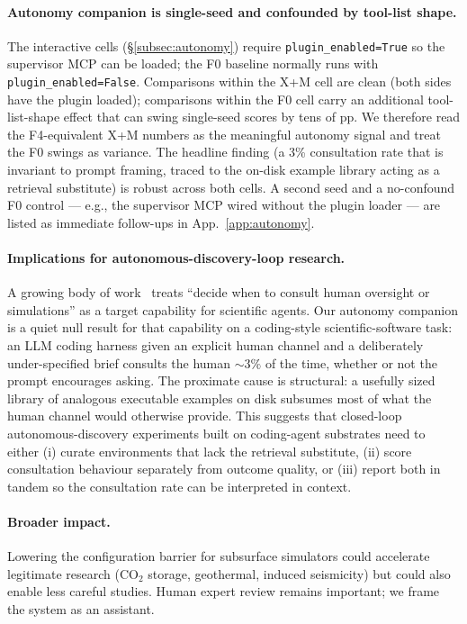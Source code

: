 \documentclass{article}
\begin{document}
\paragraph{Autonomy companion is single-seed and confounded by tool-list shape.}
The interactive cells (\S\ref{subsec:autonomy}) require \texttt{plugin\_enabled=True} so the supervisor MCP can be loaded; the F0 baseline normally runs with \texttt{plugin\_enabled=False}. Comparisons within the X+M cell are clean (both sides have the plugin loaded); comparisons within the F0 cell carry an additional tool-list-shape effect that can swing single-seed scores by tens of pp. We therefore read the F4-equivalent X+M numbers as the meaningful autonomy signal and treat the F0 swings as variance. The headline finding (a 3\% consultation rate that is invariant to prompt framing, traced to the on-disk example library acting as a retrieval substitute) is robust across both cells. A second seed and a no-confound F0 control --- e.g., the supervisor MCP wired without the plugin loader --- are listed as immediate follow-ups in App.~\ref{app:autonomy}.

\paragraph{Implications for autonomous-discovery-loop research.}
A growing body of work~\citep{boiko2023coscientist,bran2024chemcrow,lu2024aiscientist,alber2025cellvoyager} treats ``decide when to consult human oversight or simulations'' as a target capability for scientific agents. Our autonomy companion is a quiet null result for that capability on a coding-style scientific-software task: an LLM coding harness given an explicit human channel and a deliberately under-specified brief consults the human ${\sim}3\%$ of the time, whether or not the prompt encourages asking. The proximate cause is structural: a usefully sized library of analogous executable examples on disk subsumes most of what the human channel would otherwise provide. This suggests that closed-loop autonomous-discovery experiments built on coding-agent substrates need to either (i) curate environments that lack the retrieval substitute, (ii) score consultation behaviour separately from outcome quality, or (iii) report both in tandem so the consultation rate can be interpreted in context.

\paragraph{Broader impact.}
Lowering the configuration barrier for subsurface simulators could accelerate legitimate research (CO$_2$ storage, geothermal, induced seismicity) but could also enable less careful studies. Human expert review remains important; we frame the system as an assistant.
\end{document}
